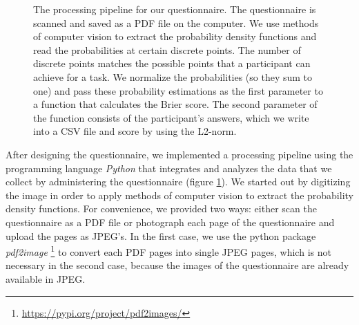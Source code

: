 \documentclass[../main/main.tex]{subfiles}
\begin{document}
\begin{figure}[H]
	\caption{The processing pipeline for our questionnaire. The questionnaire is scanned and saved as a PDF file on the computer. We use methods of computer vision to extract the probability density functions and read the probabilities at certain discrete points. The number of discrete points matches the possible points that a participant can achieve for a task. We normalize the probabilities (so they sum to one) and pass these probability estimations as the first parameter to a function that calculates the Brier score. The second parameter of the function consists of the participant's answers, which we write into a CSV file and score by using the L2-norm.}
	\label{fig:processing}
	\end{figure}

	After designing the questionnaire, we implemented a processing pipeline using the programming language \textit{Python} that integrates and analyzes the data that we collect by administering the questionnaire (figure \ref{fig:processing}). We started out by digitizing the image in order to apply methods of computer vision to extract the probability density functions. For convenience, we provided two ways: either scan the questionnaire as a PDF file or photograph each page of the questionnaire and upload the pages as JPEG's. In the first case, we use the python package \textit{pdf2image} \footnote{\url{https://pypi.org/project/pdf2images/}} to convert each PDF pages into single JPEG pages, which is not necessary in the second case, because the images of the questionnaire are already available in JPEG.  
\end{document}
